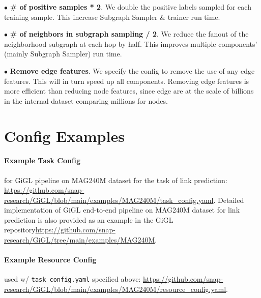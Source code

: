 \noindent $\bullet$ \textbf{\# of positive samples * 2}. We double the positive labels sampled for each training sample. This increase Subgraph Sampler \& trainer run time.

\noindent $\bullet$ \textbf{\# of neighbors in subgraph sampling / 2}. We reduce the fanout of the neighborhood subgraph at each hop by half. This improves multiple components' (mainly Subgraph Sampler) run time. 

\noindent $\bullet$ \textbf{Remove edge features}. We specify the config to remove the use of any edge features. This will in turn speed up all components. Removing edge features is more efficient than reducing node features, since edge are at the scale of billions in the internal dataset comparing millions for nodes. 

\section{Config Examples}
\label{appx:config}

\paragraph{Example Task Config} for GiGL pipeline on MAG240M dataset for the task of link prediction: \url{https://github.com/snap-research/GiGL/blob/main/examples/MAG240M/task_config.yaml}. Detailed implementation of GiGL end-to-end pipeline on MAG240M dataset for link prediction is also provided as an example in the GiGL repository\url{https://github.com/snap-research/GiGL/tree/main/examples/MAG240M}.

\paragraph{Example Resource Config} used w/ \verb+task_config.yaml+ specified above: \url{https://github.com/snap-research/GiGL/blob/main/examples/MAG240M/resource_config.yaml}.


